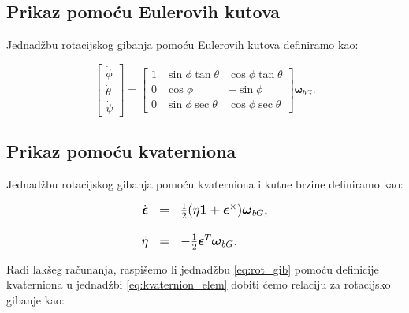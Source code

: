 \documentclass[times, utf8, diplomski, numeric]{templates/template}
\begin{document}
{{        \subsection{Prikaz pomoću Eulerovih kutova}{
            Jednadžbu rotacijskog gibanja pomoću Eulerovih kutova definiramo kao:

            \begin{equation}
                \begin{bmatrix}
                    \dot{\phi} \\
                    \dot{\theta} \\
                    \dot{\psi}
                \end{bmatrix}
                =
                \begin{bmatrix}
                    1 & \sin\phi\tan\theta & \cos\phi\tan\theta \\
                    0 & \cos\phi & -\sin\phi \\
                    0 & \sin\phi\sec\theta & \cos\phi\sec\theta
                \end{bmatrix}
                \boldsymbol{\omega}_{bG}.
            \end{equation}
        }

        \subsection{Prikaz pomoću kvaterniona}{
            Jednadžbu rotacijskog gibanja pomoću kvaterniona i kutne brzine definiramo kao:

            \begin{equation}
            \large
            \label{eq:rot_gib}
            \begin{array}{rcl}
                \dot{\boldsymbol\epsilon} &  = & \frac{1}{2}(\eta\boldsymbol{1} + \boldsymbol{\epsilon}^\times)\boldsymbol{\omega}_{bG}, \\
                & & \\
                \dot{\eta} & = & -\frac{1}{2}\boldsymbol{\epsilon}^T\boldsymbol{\omega}_{bG}.
            \end{array}
            \end{equation}

            Radi lakšeg računanja, raspišemo li jednadžbu \ref{eq:rot_gib} pomoću definicije kvaterniona u jednadžbi \ref{eq:kvaternion_elem} dobiti ćemo relaciju za rotacijsko gibanje \cite{uvod_u_svemirske} kao:

}}}
\end{document}
